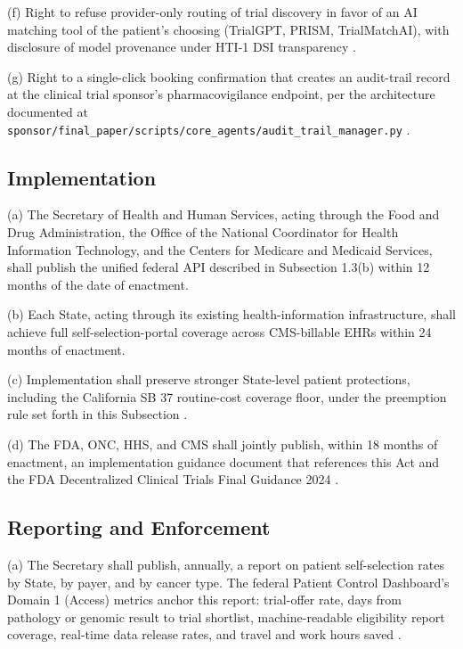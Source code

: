 (f) Right to refuse provider-only routing of trial discovery in
favor of an AI matching tool of the patient's choosing (TrialGPT,
PRISM, TrialMatchAI), with disclosure of model provenance under
HTI-1 DSI transparency \cite{hti1_dsi_fact_sheet_2023}.

(g) Right to a single-click booking confirmation that creates an
audit-trail record at the clinical trial sponsor's pharmacovigilance endpoint, per
the architecture documented at
\texttt{sponsor/final\_paper/scripts/core\_agents/audit\_trail\_manager.py}
\cite{kawchak_2026_19396256}.

\subsection{Implementation}


\hspace{0.5cm} (a) The Secretary of Health and Human Services, acting through the
Food and Drug Administration, the Office of the National Coordinator
for Health Information Technology, and the Centers for Medicare and
Medicaid Services, shall publish the unified federal API described in
Subsection 1.3(b) within 12 months of the date of enactment.

(b) Each State, acting through its existing health-information
infrastructure, shall achieve full self-selection-portal coverage
across CMS-billable EHRs within 24 months of enactment.

(c) Implementation shall preserve stronger State-level patient
protections, including the California SB 37 routine-cost coverage
floor, under the preemption rule set forth in this Subsection
\cite{rank8_california_sb37_2001, rank4_fdora_fda_modernization_2022}.

(d) The FDA, ONC, HHS, and CMS shall jointly publish, within 18
months of enactment, an implementation guidance document that
references this Act and the FDA Decentralized Clinical Trials Final
Guidance 2024 \cite{fda_dct_guidance_2024}.

\subsection{Reporting and Enforcement}

\hspace{0.5cm} (a) The Secretary shall publish, annually, a report on patient self-selection rates by State, by payer, and by cancer type. The federal
Patient Control Dashboard's Domain 1 (Access) metrics anchor this
report: trial-offer rate, days from pathology or genomic result to
trial shortlist, machine-readable eligibility report coverage, real-time data release rates, and travel and work hours saved
\cite{hhs_right_to_access_2025, rocque2025remote_symptom_monitoring}.

